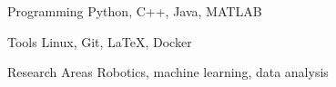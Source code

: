 
\VectraSkillGroup
    {Programming}
    {Python, C++, Java, MATLAB}

\VectraSkillGroup
    {Tools}
    {Linux, Git, LaTeX, Docker}

\VectraSkillGroup
    {Research Areas}
    {Robotics, machine learning, data analysis}